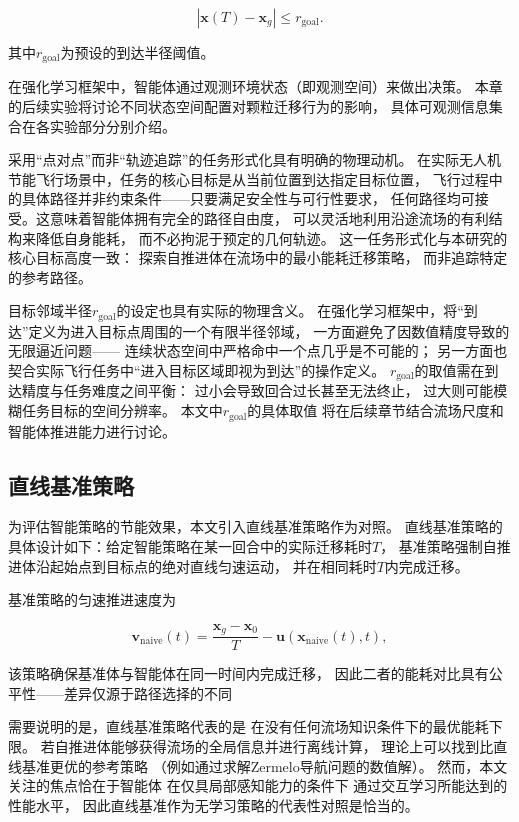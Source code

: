 \begin{equation}
    |\mathbf{x}(T) - \mathbf{x}_g| \leq r_{\text{goal}}.
    \label{eq:goal_condition}
\end{equation}

其中$r_{\text{goal}}$为预设的到达半径阈值。

在强化学习框架中，智能体通过观测环境状态（即观测空间）来做出决策。
本章的后续实验将讨论不同状态空间配置对颗粒迁移行为的影响，
具体可观测信息集合在各实验部分分别介绍。

采用“点对点”而非“轨迹追踪”的任务形式化具有明确的物理动机。
在实际无人机节能飞行场景中，任务的核心目标是从当前位置到达指定目标位置，
飞行过程中的具体路径并非约束条件——只要满足安全性与可行性要求，
任何路径均可接受。这意味着智能体拥有完全的路径自由度，
可以灵活地利用沿途流场的有利结构来降低自身能耗，
而不必拘泥于预定的几何轨迹。
这一任务形式化与本研究的核心目标高度一致：
探索自推进体在流场中的最小能耗迁移策略，
而非追踪特定的参考路径。

目标邻域半径$r_{\text{goal}}$的设定也具有实际的物理含义。
在强化学习框架中，将“到达”定义为进入目标点周围的一个有限半径邻域，
一方面避免了因数值精度导致的无限逼近问题——
连续状态空间中严格命中一个点几乎是不可能的；
另一方面也契合实际飞行任务中“进入目标区域即视为到达”的操作定义。
$r_{\text{goal}}$的取值需在到达精度与任务难度之间平衡：
过小会导致回合过长甚至无法终止，
过大则可能模糊任务目标的空间分辨率。
本文中$r_{\text{goal}}$的具体取值
将在后续章节结合流场尺度和智能体推进能力进行讨论。



\subsection{直线基准策略}

为评估智能策略的节能效果，本文引入直线基准策略作为对照。
直线基准策略的具体设计如下：给定智能策略在某一回合中的实际迁移耗时$T$，
基准策略强制自推进体沿起始点到目标点的绝对直线匀速运动，
并在相同耗时$T$内完成迁移。

基准策略的匀速推进速度为

\begin{equation}
    \mathbf{v}_{\text{naive}}(t) = \frac{\mathbf{x}_g - \mathbf{x}_0}{T} - \mathbf{u}(\mathbf{x}_{\text{naive}}(t), t),
    \label{eq:naive_velocity}
\end{equation}

该策略确保基准体与智能体在同一时间内完成迁移，
因此二者的能耗对比具有公平性——差异仅源于路径选择的不同

需要说明的是，直线基准策略代表的是
在没有任何流场知识条件下的最优能耗下限。
若自推进体能够获得流场的全局信息并进行离线计算，
理论上可以找到比直线基准更优的参考策略
（例如通过求解Zermelo导航问题的数值解）。
然而，本文关注的焦点恰在于智能体
在仅具局部感知能力的条件下
通过交互学习所能达到的性能水平，
因此直线基准作为无学习策略的代表性对照是恰当的。

